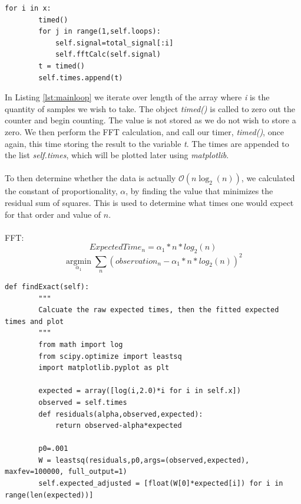 \begin{lstlisting}[caption={Main Loop Execution},label=lst:mainloop,firstnumber=45]
    for i in x:
        timed()
        for j in range(1,self.loops):
            self.signal=total_signal[:i]
            self.fftCalc(self.signal)
        t = timed()
        self.times.append(t)
\end{lstlisting}
In Listing \ref{lst:mainloop} we iterate over length of the array where \emph{i} is the quantity of samples we wish to take. The object \emph{timed()} is called to zero out the counter and begin counting. The value is not stored as we do not wish to store a zero. We then perform the FFT calculation, and call our timer, \emph{timed()}, once again, this time storing the result to the variable \emph{t}. The times are appended to the list \emph{self.times}, which will be plotted later using \emph{matplotlib}.
\\\\
To then determine whether the data is actually $\mathcal{O}(n \log_2(n))$, we calculated the constant of proportionality, $\alpha$, by finding the value that minimizes the residual sum of squares. This is used to determine what times one would expect for that order and value of $n$.
\\\\
FFT:
\begin{equation}
    ExpectedTime_n=\alpha_1*n*log_2(n)
\end{equation}\noindent
\begin{equation}
    \underset{\alpha_1}{\operatorname{argmin}}
    \sum_{n}(observation_n-\alpha_1*n*log_2(n))^2
\end{equation}\noindent


\begin{lstlisting}[caption={Calculate the expected times},label=lst:expected_times,firstnumber=88]
    def findExact(self):
        """
        Calcuate the raw expected times, then the fitted expected times and plot
        """
        from math import log
        from scipy.optimize import leastsq
        import matplotlib.pyplot as plt
        
        expected = array([log(i,2.0)*i for i in self.x])
        observed = self.times
        def residuals(alpha,observed,expected):
            return observed-alpha*expected
        
        p0=.001
        W = leastsq(residuals,p0,args=(observed,expected), maxfev=100000, full_output=1)
        self.expected_adjusted = [float(W[0]*expected[i]) for i in range(len(expected))]
\end{lstlisting}


